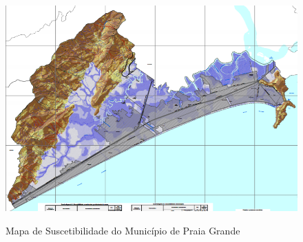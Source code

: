 	\begin{figure}[h!]
		\centering
		\caption{Mapa de Suscetibilidade do Município de Praia Grande}
		\includegraphics[width=1\textwidth]{img/mapa_suscetibilidade.png}
		\label{mapa_susce}
	\end{figure}

